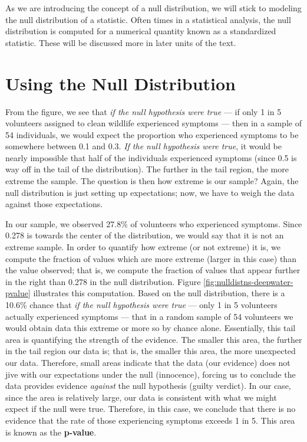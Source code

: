 \documentclass[]{book}
\theoremstyle{plain}
\theoremstyle{mydefn}
\theoremstyle{myexmpl}
\theoremstyle{remark}
\begin{document}
As we are introducing the concept of a null distribution, we will stick
to modeling the null distribution of a statistic. Often times in a
statistical analysis, the null distribution is computed for a numerical
quantity known as a standardized statistic. These will be discussed more
in later units of the text.

\section{Using the Null Distribution}\label{using-the-null-distribution}

From the figure, we see that \emph{if the null hypothesis were true} ---
if only 1 in 5 volunteers assigned to clean wildlife experienced
symptoms --- then in a sample of 54 individuals, we would expect the
proportion who experienced symptoms to be somewhere between 0.1 and 0.3.
\emph{If the null hypothesis were true}, it would be nearly impossible
that half of the individuals experienced symptoms (since 0.5 is way off
in the tail of the distribution). The further in the tail region, the
more extreme the sample. The question is then how extreme is our sample?
Again, the null distribution is just setting up expectations; now, we
have to weigh the data against those expectations.

In our sample, we observed 27.8\% of volunteers who experienced
symptoms. Since 0.278 is towards the center of the distribution, we
would say that it is not an extreme sample. In order to quantify how
extreme (or not extreme) it is, we compute the fraction of values which
are more extreme (larger in this case) than the value observed; that is,
we compute the fraction of values that appear further in the right than
0.278 in the null distribution. Figure
\ref{fig:nulldistns-deepwater-pvalue} illustrates this computation.
Based on the null distribution, there is a 10.6\% chance that \emph{if
the null hypothesis were true} --- only 1 in 5 volunteers actually
experienced symptoms --- that in a random sample of 54 volunteers we
would obtain data this extreme or more so by chance alone. Essentially,
this tail area is quantifying the strength of the evidence. The smaller
this area, the further in the tail region our data is; that is, the
smaller this area, the more unexpected our data. Therefore, small areas
indicate that the data (our evidence) does not jive with our
expectations under the null (innocence), forcing us to conclude the data
provides evidence \emph{against} the null hypothesis (guilty verdict).
In our case, since the area is relatively large, our data is consistent
with what we might expect if the null were true. Therefore, in this
case, we conclude that there is no evidence that the rate of those
experiencing symptoms exceeds 1 in 5. This area is known as the
\textbf{p-value}.
\end{document}
